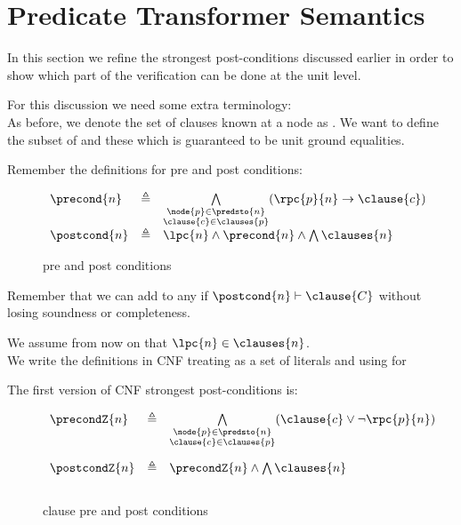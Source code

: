\newpage
\section{Predicate Transformer Semantics} \label{predicate_transformer_semantics_section}
In this section we refine the strongest post-conditions discussed earlier in order to show which part of the verification can be done at the unit level. 

For this discussion we need some extra terminology:\\
As before, we denote the set of clauses known at a node  as .
We want to define the subset of  and  these which is guaranteed to be unit ground equalities.

Remember the definitions for pre and post conditions:
\begin{figure}[H]
$
\begin{array}{lll}
	\precond{n}  &\triangleq   & \bigwedge\limits_{\substack{\node{p} \in \predsto{n} \\ \clause{c} \in \clauses{p}}} (\rpc{p}{n} \rightarrow \clause{c}) \\
	\postcond{n} & \triangleq  & \lpc{n} \land \precond{n} \land \bigwedge \clauses{n}
\end{array}
$
\caption{pre and post conditions}
\end{figure}

Remember that we can add to  any  if $\postcond{n} \vdash \clause{C}$ without losing soundness or completeness.

We assume from now on that $\lpc{n} \in \clauses{n}$.\\
We write the definitions in CNF treating  as a set of literals and using
 for 

The first version of CNF strongest post-conditions is:
\begin{figure}[H]
$
\begin{array}{lll}
	\vspace{10pt}
	\precondZ{n}  & \triangleq & \bigwedge\limits_{\substack{\node{p} \in \predsto{n} \\ \clause{c} \in \clauses{p}}} 
(\clause{c} \lor \lnot \rpc{p}{n} )\\
	\vspace{10pt}
	\postcondZ{n} & \triangleq & \precondZ{n} \land \bigwedge \clauses{n} \\
\end{array}
$
\caption{clause pre and post conditions}
\end{figure}

